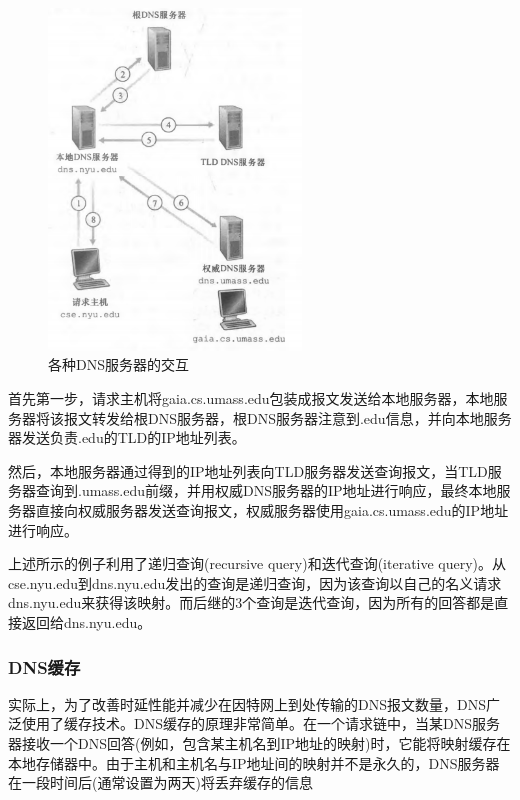 \begin{figure}[!htbp]
    \centering
    \includegraphics[width=0.6\textwidth]{image/chapter02/各种DNS服务器的交互.png}
    \caption{各种DNS服务器的交互}
\end{figure}

    首先第一步，请求主机将gaia.cs.umass.edu包装成报文发送给本地服务器，本地服务器将该报文转发给根DNS服务器，根DNS服务器注意到.edu信息，并向本地服务器发送负责.edu的TLD的IP地址列表。

    然后，本地服务器通过得到的IP地址列表向TLD服务器发送查询报文，当TLD服务器查询到.umass.edu前缀，并用权威DNS服务器的IP地址进行响应，最终本地服务器直接向权威服务器发送查询报文，权威服务器使用gaia.cs.umass.edu的IP地址进行响应。

    上述所示的例子利用了递归查询(recursive query)和迭代查询(iterative query)。从cse.nyu.edu到dns.nyu.edu发出的查询是递归查询，因为该查询以自己的名义请求dns.nyu.edu来获得该映射。而后继的3个查询是迭代查询，因为所有的回答都是直接返回给dns.nyu.edu。

\subsubsection{DNS缓存}

    实际上，为了改善时延性能并减少在因特网上到处传输的DNS报文数量，DNS广泛使用了缓存技术。DNS缓存的原理非常简单。在一个请求链中，当某DNS服务器接收一个DNS回答(例如，包含某主机名到IP地址的映射)时，它能将映射缓存在本地存储器中。由于主机和主机名与IP地址间的映射并不是永久的，DNS服务器在一段时间后(通常设置为两天)将丢弃缓存的信息


